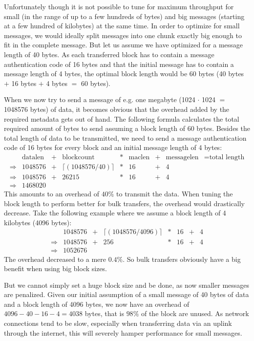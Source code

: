 Unfortunately though it is not possible to tune for maximum throughput for small (in the range of up to a few hundreds of bytes) and big messages (starting at a few hundred of kilobytes) at the same time.
In order to optimize for small messages, we would ideally split messages into one chunk exactly big enough to fit in the complete message.
But let us assume we have optimized for a message length of 40 bytes.
As each transferred block has to contain a message authentication code of 16 bytes and that the initial message has to contain a message length of 4 bytes, the optimal block length would be 60 bytes (40 bytes $+$ 16 bytes $+$ 4 bytes $=$ 60 bytes).

When we now try to send a message of e.g. one megabyte (1024 $\cdot$ 1024 $=$ 1048576 bytes)  of data, it becomes obvious that the overhead added by the required metadata gets out of hand.
The following formula calculates the total required amount of bytes to send assuming a block length of 60 bytes.
Besides the total length of data to be transmitted, we need to send a message authentication code of 16 bytes for every block and an initial message length of 4 bytes:
\begin{align*}
    &\text{datalen} &+ &\text{blockcount} &* &\text{maclen} &+ &\text{messagelen} &= \text{total length}\\
    \Rightarrow &1048576 &+ & \lceil(1048576 / 40)\rceil &* &16 &+ &4\\
    \Rightarrow &1048576 &+ & 26215 &* &16 &+ &4\\
    \Rightarrow &1468020
\end{align*}
This amounts to an overhead of $40\%$ to transmit the data.
When tuning the block length to perform better for bulk transfers, the overhead would drastically decrease.
Take the following example where we assume a block length of 4 kilobytes (4096 bytes):
\begin{align*}
    &1048576 &+ &\lceil(1048576 / 4096)\rceil &* &16 &+ &4\\
    \Rightarrow &1048576 &+ &256 &* &16 &+ &4\\
    \Rightarrow &1052676
\end{align*}
The overhead decreased to a mere $0.4\%$.
So bulk transfers obviously have a big benefit when using big block sizes.

But we cannot simply set a huge block size and be done, as now smaller messages are penalized.
Given our initial assumption of a small message of 40 bytes of data and a block length of 4096 bytes, we now have an overhead of $4096 - 40 - 16 - 4 = 4038$ bytes, that is $98\%$ of the block are unused.
As network connections tend to be slow, especially when transferring data via an uplink through the internet, this will severely hamper performance for small messages.

